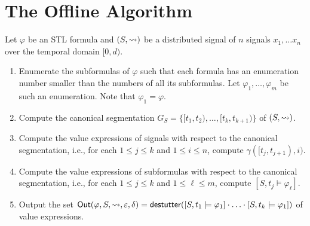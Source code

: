\section{The Offline Algorithm}

Let $\varphi$ be an STL formula and $(S,{\rightsquigarrow})$ be a distributed signal of $n$ signals $x_1, \ldots x_n$ over the temporal domain $[0,d)$.

\begin{enumerate}
	\item 
	Enumerate the subformulas of $\varphi$ such that each formula has an enumeration number smaller than the numbers of all its subformulas.
	Let $\varphi_1, \ldots, \varphi_m$ be such an enumeration.
	Note that $\varphi_1 = \varphi$.
	
	\item
	Compute the canonical segmentation $G_{S} = \{ [t_1, t_2), \ldots, [t_k, t_{k+1}) \}$ of $(S, {\rightsquigarrow})$.
	
	\item
	Compute the value expressions of signals with respect to the canonical segmentation, i.e., for each $1 \leq j \leq k$ and $1 \leq i \leq n$, compute $\gamma([t_j, t_{j+1}), i)$.
	
	\item
	Compute the value expressions of subformulas with respect to the canonical segmentation, i.e., for each $1 \leq j \leq k$ and $1 \leq \ell \leq m$, compute $[S, t_j \models \varphi_\ell]$.
	
	\item
	Output the set $\mathsf{Out}(\varphi, S, {\rightsquigarrow}, \varepsilon, \delta) = \mathsf{destutter}([S,t_1 \models \varphi_1] \cdot \ldots \cdot [S,t_k \models \varphi_1])$ of value expressions. 
\end{enumerate}

